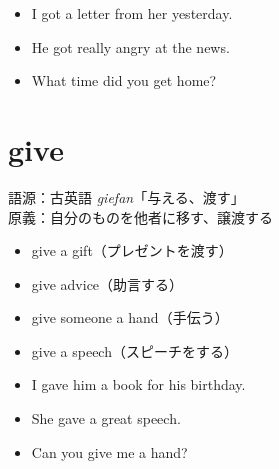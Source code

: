 ﻿\documentclass[a4paper,12pt]{article}
\begin{document}
\begin{tcolorbox}[title=例文]

\begin{itemize}
  \item I got a letter from her yesterday.
  \item He got really angry at the news.
  \item What time did you get home?
\end{itemize}

\end{tcolorbox}



\section*{give}

\begin{tcolorbox}[title=語源と原義]
語源：古英語 \textit{giefan}「与える、渡す」\\
原義：自分のものを他者に移す、譲渡する
\end{tcolorbox}

\begin{tcolorbox}[title=意味の展開]

\begin{itemize}
  \item give a gift（プレゼントを渡す）
  \item give advice（助言する）
  \item give someone a hand（手伝う）
  \item give a speech（スピーチをする）
\end{itemize}

\end{tcolorbox}

\begin{tcolorbox}[title=例文]

\begin{itemize}
  \item I gave him a book for his birthday.
  \item She gave a great speech.
  \item Can you give me a hand?
\end{itemize}

\end{tcolorbox}
\end{document}
